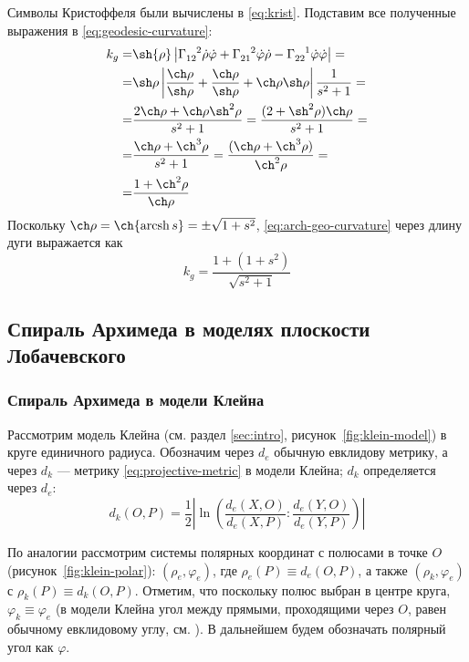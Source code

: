 \documentclass{article}
\numberwithin{equation}{section}
\renewcommand{\phi}{\varphi}
\newcommand{\krist}[3]{\Gamma^{\phantom{#1 #2}#3}_{#1 #2}}
\DeclareMathOperator{\arcsh}{arcsh}
\providecommand{\abs}[1]{\left \lvert{#1}\right \rvert}
\begin{document}
Символы Кристоффеля были вычислены в \eqref{eq:krist}. Подставим все
полученные выражения в \eqref{eq:geodesic-curvature}:
\begin{equation}\label{eq:arch-geo-curvature}
  \begin{split}
    k_g =& \sh{\rho} \abs{\krist{1}{2}{2} \dot{\rho} \dot{\phi} +
      \krist{2}{1}{2} \dot{\phi} \dot{\rho} - \krist{2}{2}{1}
      \dot{\phi} \dot {\phi}}= \\
    =& \sh\rho \abs{\frac{\ch\rho}{\sh\rho} +
      \frac{\ch\rho}{\sh\rho} + \ch\rho \sh\rho} \frac{1}{s^2+1} = \\
    =& \frac{2\ch\rho + \ch\rho \sh^2\rho}{s^2+1}
    = \frac{(2+\sh^2\rho)\ch\rho}{s^2+1} = \\
    =& \frac{\ch\rho + \ch^3\rho}{s^2+1} =
    \frac{(\ch\rho+\ch^3\rho)}{\ch^2\rho} = \\
    =& \frac{1 + \ch^2\rho}{\ch\rho}
  \end{split}
\end{equation}
Поскольку $\ch\rho = \ch{\arcsh{s}} = \pm\sqrt{1+s^2}$,
\eqref{eq:arch-geo-curvature} через длину дуги выражается как
\begin{equation}\label{eq:arch-geo-curvature-nat}
  k_g=\frac{1 + (1+s^2)}{\sqrt{s^2+1}}
\end{equation}

\clearpage
\subsection{Спираль Архимеда в моделях плоскости Лобачевского}

\subsubsection{Спираль Архимеда в модели Клейна}
\label{sec:arch-spiral-klein}

Рассмотрим модель Клейна (см. раздел \ref{sec:intro},
рисунок \ref{fig:klein-model}) в круге единичного радиуса. Обозначим
через $d_e$ обычную евклидову метрику, а через $d_k$ — метрику
\eqref{eq:projective-metric} в модели Клейна; $d_k$ определяется через
$d_e$:
\begin{equation}\label{eq:projective-metric-centered}
  d_k(O,P) = \frac{1}{2}\abs{\ln\left(\frac{d_e(X,O)}{d_e(X,P)}:\frac{d_e(Y,O)}{d_e(Y,P)}\right)}
\end{equation}

По аналогии рассмотрим системы полярных координат с полюсами в точке
$O$ (рисунок \ref{fig:klein-polar}): $(\rho_e, \phi_e)$, где
$\rho_e(P) \equiv d_e(O,P)$, а также $(\rho_k, \phi_e)$ с $\rho_k(P)
\equiv d_k(O, P)$. Отметим, что поскольку полюс выбран в центре круга,
$\phi_k \equiv \phi_e$ (в модели Клейна угол между прямыми,
проходящими через $O$, равен обычному евклидовому углу, см.
\cite{zaslavsky04}). В дальнейшем будем обозначать полярный угол как
$\phi$.
\end{document}

